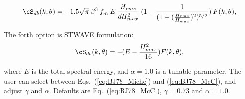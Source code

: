 \begin{equation}
\cS_{db} (k,\theta) = - 1.5 \sqrt{\pi} \: \beta^3 \: f_m  \: E \: \frac{H_{rms}}{dH_{max}^2}  \: (1- \frac{1}{(1+(\frac{H_{rms}}{H_{max}})^2)^{5/2}}) \: F(k,\theta)
 , \label{eq:BJ783c}
\end{equation}

The forth option is STWAVE formulation:
\begin{equation}
\cS_{db} (k,\theta) =-({E} -\frac{H_{max}^2}{16})F(k,\theta)
 , \label{eq:BJ78}
\end{equation}


\noindent
where $E$ is the total spectral energy, and $\alpha = 1.0$ is a tunable
parameter. The user can select between Eqs.~(\ref{eq:BJ78_Miche}) and
(\ref{eq:BJ78_McC}), and adjust $\gamma$ and $\alpha$. Defaults are
Eq.~(\ref{eq:BJ78_McC}), $\gamma = 0.73$ and $\alpha = 1.0$.

